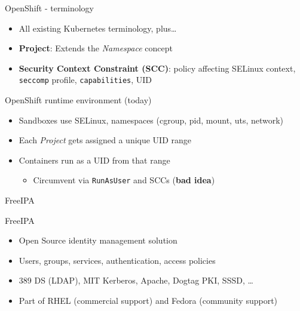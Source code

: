 \documentclass[ignorenonframetext,aspectratio=169,12pt]{beamer}
\begin{document}
\begin{frame}{OpenShift - terminology}
\protect\hypertarget{openshift-terminology}{}

\begin{itemize}

\item All existing Kubernetes terminology, plus\ldots{}

\item {\bf Project}: Extends the {\em Namespace} concept

\item {\bf Security Context Constraint (SCC)}: policy affecting
    SELinux context, {\tt seccomp} profile, {\tt capabilities}, UID

\end{itemize}

\end{frame}

\begin{frame}{OpenShift runtime environment (today)}
\protect\hypertarget{openshift-runtime-today}{}
\begin{itemize}
\item Sandboxes use SELinux, namespaces (cgroup, pid, mount, uts, network)
\item Each {\em Project} gets assigned a unique UID range
\item Containers run as a UID from that range
    \begin{itemize}
    \item Circumvent via {\tt RunAsUser} and SCCs ({\bf bad idea})
    \end{itemize}
\end{itemize}
\end{frame}


\begin{frame}[plain]
\centering
\huge FreeIPA
\end{frame}


\begin{frame}{FreeIPA}
\protect\hypertarget{freeipa-intro}{}

\begin{itemize}
\item Open Source identity management solution
\item Users, groups, services, authentication, access policies
\item 389 DS (LDAP), MIT Kerberos, Apache, Dogtag PKI, SSSD, \ldots{}
\item Part of RHEL (commercial support) and Fedora (community support)
\end{itemize}

\end{frame}
\end{document}
